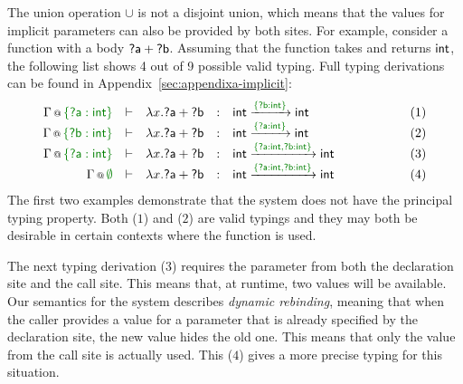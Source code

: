 The union operation $\cup$ is not a disjoint union, which means that the values for implicit 
parameters can also be provided by both sites. For example, consider a function with a body
$\ident{?a} + \ident{?b}$. Assuming that the function takes and returns $\textnormal{\sffamily int}$, the following
list shows 4 out of 9 possible valid typing. Full typing derivations can be found in Appendix~\ref{sec:appendixa-implicit}:
%
\label{pg:applications-flat-paramsex}
\begin{equation*}
\begin{array}{rcllllr}
\coctx{\Gamma}{\cclrd{ \{ \ident{?a}:\ident{int} \} }} &\vdash& \lambda x.\ident{?a} + \ident{?b} &:& 
  \ident{int} \xrightarrow{\cclrd{ \{ \ident{?b}:\ident{int} \} }} \ident{int} &\qquad\qquad&(1) \\
\coctx{\Gamma}{\cclrd{ \{ \ident{?b}:\ident{int} \} }} &\vdash& \lambda x.\ident{?a} + \ident{?b} &:& 
  \ident{int} \xrightarrow{\cclrd{ \{ \ident{?a}:\ident{int} \} }} \ident{int} &&(2)\\
\coctx{\Gamma}{\cclrd{ \{\ident{?a}:\ident{int} \} }} &\vdash& \lambda x.\ident{?a} + \ident{?b} &:& 
  \ident{int} \xrightarrow{\cclrd{ \{\ident{?a}:\ident{int}, \ident{?b}:\ident{int} \} }} \ident{int} &&(3)\\
\coctx{\Gamma}{\cclrd{ \emptyset }} &\vdash& \lambda x.\ident{?a} + \ident{?b} &:& 
  \ident{int} \xrightarrow{\cclrd{ \{\ident{?a}:\ident{int}, \ident{?b}:\ident{int} \} }} \ident{int} &&(4)
\end{array}
\end{equation*}
%
The first two examples demonstrate that the system does not have the principal typing property. 
Both ($1$) and ($2$) are valid typings and they may both be desirable in certain contexts where
the function is used. 

The next typing derivation ($3$) requires the parameter  from both the declaration site and 
the call site. This means that, at runtime, two values will be available. Our semantics for the 
system describes \emph{dynamic rebinding}, meaning that when the caller provides a value for a 
parameter that is already specified by the declaration site, the new value hides the old one. This
means that only the value from the call site is actually used. This ($4$) gives a more precise
typing for this situation.


